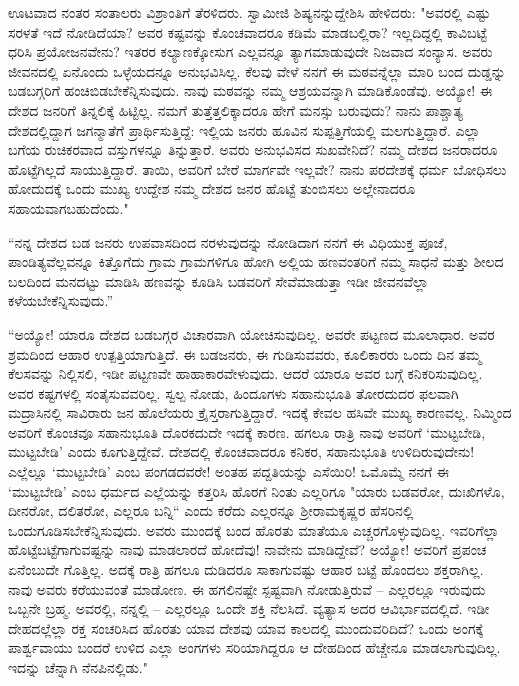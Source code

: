 ಊಟವಾದ ನಂತರ ಸಂತಾಲರು ವಿಶ್ರಾಂತಿಗೆ ತೆರಳಿದರು. ಸ್ವಾಮೀಜಿ ಶಿಷ್ಯನನ್ನುದ್ದೇಶಿಸಿ ಹೇಳಿದರು: "ಅವರಲ್ಲಿ ಎಷ್ಟು ಸರಳತೆ ಇದೆ ನೋಡಿದೆಯಾ? ಅವರ ಕಷ್ಟವನ್ನು ಕೊಂಚವಾದರೂ ಕಡಿಮೆ ಮಾಡಬಲ್ಲಿರಾ? ಇಲ್ಲದಿದ್ದಲ್ಲಿ ಕಾವಿಬಟ್ಟೆ ಧರಿಸಿ ಪ್ರಯೋಜನವೇನು? ಇತರರ ಕಲ್ಯಾಣಕ್ಕೋಸುಗ ಎಲ್ಲವನ್ನೂ ತ್ಯಾಗಮಾಡುವುದೇ ನಿಜವಾದ ಸಂನ್ಯಾಸ. ಅವರು ಜೀವನದಲ್ಲಿ ಏನೊಂದು ಒಳ್ಳೆಯದನ್ನೂ ಅನುಭವಿಸಿಲ್ಲ. ಕೆಲವು ವೇಳೆ ನನಗೆ ಈ ಮಠವನ್ನೆಲ್ಲಾ ಮಾರಿ ಬಂದ ದುಡ್ಡನ್ನು ಬಡಬಗ್ಗರಿಗೆ ಹಂಚಿಬಿಡಬೇಕೆನ್ನಿಸುವುದು. ನಾವು ಮಠವನ್ನು ನಮ್ಮ ಆಶ್ರಯವನ್ನಾಗಿ ಮಾಡಿಕೊಂಡೆವು. ಅಯ್ಯೋ! ಈ ದೇಶದ ಜನರಿಗೆ ತಿನ್ನಲಿಕ್ಕೆ ಹಿಟ್ಟಿಲ್ಲ. ನಮಗೆ ತುತ್ತೆತ್ತಲಿಕ್ಕಾದರೂ ಹೇಗೆ ಮನಸ್ಸು ಬರುವುದು? ನಾನು ಪಾಶ್ಚಾತ್ಯ ದೇಶದಲ್ಲಿದ್ದಾಗ ಜಗನ್ಮಾತೆಗೆ ಪ್ರಾರ್ಥಿಸುತ್ತಿದ್ದೆ: ಇಲ್ಲಿಯ ಜನರು ಹೂವಿನ ಸುಪ್ಪತ್ತಿಗೆಯಲ್ಲಿ ಮಲಗುತ್ತಿದ್ದಾರೆ. ಎಲ್ಲಾ ಬಗೆಯ ರುಚಿಕರವಾದ ವಸ್ತುಗಳನ್ನೂ ತಿನ್ನುತ್ತಾರೆ. ಅವರು ಅನುಭವಿಸದ ಸುಖವೇನಿದೆ? ನಮ್ಮ ದೇಶದ ಜನರಾದರೂ ಹೊಟ್ಟೆಗಿಲ್ಲದೆ ಸಾಯುತ್ತಿದ್ದಾರೆ. ತಾಯಿ, ಅವರಿಗೆ ಬೇರೆ ಮಾರ್ಗವೇ ಇಲ್ಲವೇ? ನಾನು ಪರದೇಶಕ್ಕೆ ಧರ್ಮ ಬೋಧಿಸಲು ಹೋದುದಕ್ಕೆ ಒಂದು ಮುಖ್ಯ ಉದ್ದೇಶ ನಮ್ಮ ದೇಶದ ಜನರ ಹೊಟ್ಟೆ ತುಂಬಿಸಲು ಅಲ್ಲೇನಾದರೂ ಸಹಾಯವಾಗಬಹುದೆಂದು."

“ನನ್ನ ದೇಶದ ಬಡ ಜನರು ಉಪವಾಸದಿಂದ ನರಳುವುದನ್ನು ನೋಡಿದಾಗ ನನಗೆ ಈ ವಿಧಿಯುಕ್ತ ಪೂಜೆ, ಪಾಂಡಿತ್ಯವೆಲ್ಲವನ್ನೂ ಕಿತ್ತೊಗೆದು ಗ್ರಾಮ ಗ್ರಾಮಗಳಿಗೂ ಹೋಗಿ ಅಲ್ಲಿಯ ಹಣವಂತರಿಗೆ ನಮ್ಮ ಸಾಧನೆ ಮತ್ತು ಶೀಲದ ಬಲದಿಂದ ಮನದಟ್ಟು ಮಾಡಿಸಿ ಹಣವನ್ನು ಕೂಡಿಸಿ ಬಡವರಿಗೆ ಸೇವೆಮಾಡುತ್ತಾ ಇಡೀ ಜೀವನವೆಲ್ಲಾ ಕಳೆಯಬೇಕೆನ್ನಿಸುವುದು.”

“ಅಯ್ಯೋ! ಯಾರೂ ದೇಶದ ಬಡಬಗ್ಗರ ವಿಚಾರವಾಗಿ ಯೋಚಿಸುವುದಿಲ್ಲ. ಅವರೇ ಪಟ್ಟಣದ ಮೂಲಾಧಾರ. ಅವರ ಶ್ರಮದಿಂದ ಆಹಾರ ಉತ್ಪತ್ತಿಯಾಗುತ್ತಿದೆ. ಈ ಬಡಜನರು, ಈ ಗುಡಿಸುವವರು, ಕೂಲಿಕಾರರು ಒಂದು ದಿನ ತಮ್ಮ ಕೆಲಸವನ್ನು ನಿಲ್ಲಿಸಲಿ, ಇಡೀ ಪಟ್ಟಣವೇ ಹಾಹಾಕಾರವೇಳುವುದು. ಆದರೆ ಯಾರೂ ಅವರ ಬಗ್ಗೆ ಕನಿಕರಿಸುವುದಿಲ್ಲ. ಅವರ ಕಷ್ಟಗಳಲ್ಲಿ ಸಂತೈಸುವವರಿಲ್ಲ. ಸ್ವಲ್ಪ ನೋಡು, ಹಿಂದೂಗಳು ಸಹಾನುಭೂತಿ ತೋರದುದರ ಫಲವಾಗಿ ಮದ್ರಾಸಿನಲ್ಲಿ ಸಾವಿರಾರು ಜನ ಹೊಲೆಯರು ಕ್ರೈಸ್ತರಾಗುತ್ತಿದ್ದಾರೆ. ಇದಕ್ಕೆ ಕೇವಲ ಹಸಿವೇ ಮುಖ್ಯ ಕಾರಣವಲ್ಲ. ನಿಮ್ಮಿಂದ ಅವರಿಗೆ ಕೊಂಚವೂ ಸಹಾನುಭೂತಿ ದೊರಕದುದೇ ಇದಕ್ಕೆ ಕಾರಣ. ಹಗಲೂ ರಾತ್ರಿ ನಾವು ಅವರಿಗೆ ‘ಮುಟ್ಟಬೇಡಿ, ಮುಟ್ಟಬೇಡಿ’ ಎಂದು ಕೂಗುತ್ತಿದ್ದೇವೆ. ದೇಶದಲ್ಲಿ ಕೊಂಚವಾದರೂ ಕನಿಕರ, ಸಹಾನುಭೂತಿ ಉಳಿದಿರುವುದೇನು! ಎಲ್ಲೆಲ್ಲೂ ‘ಮುಟ್ಟಬೇಡಿ’ ಎಂಬ ಪಂಗಡದವರೇ! ಅಂತಹ ಪದ್ದತಿಯನ್ನು ಎಸೆಯಿರಿ! ಒಮೊಮ್ಮೆ ನನಗೆ ಈ ‘ಮುಟ್ಟಬೇಡಿ’ ಎಂಬ ಧರ್ಮದ ಎಲ್ಲೆಯನ್ನು ಕತ್ತರಿಸಿ ಹೊರಗೆ ನಿಂತು ಎಲ್ಲರಿಗೂ "ಯಾರು ಬಡವರೋ, ದುಃಖಿಗಳೊ, ದೀನರೋ, ದಲಿತರೋ, ಎಲ್ಲರೂ ಬನ್ನಿ“ ಎಂದು ಕರೆದು ಎಲ್ಲರನ್ನೂ ಶ‍್ರೀರಾಮಕೃಷ್ಣರ ಹೆಸರಿನಲ್ಲಿ ಒಂದುಗೂಡಿಸಬೇಕೆನ್ನಿಸುವುದು. ಅವರು ಮುಂದಕ್ಕೆ ಬಂದ ಹೊರತು ಮಾತೆಯೂ ಎಚ್ಚರಗೊಳ್ಳುವುದಿಲ್ಲ. ಇವರಿಗೆಲ್ಲಾ ಹೊಟ್ಟೆಬಟ್ಟೆಗಾಗುವಷ್ಟನ್ನು ನಾವು ಮಾಡಲಾರದೆ ಹೋದೆವು! ನಾವೇನು ಮಾಡಿದ್ದೇವೆ? ಅಯ್ಯೋ! ಅವರಿಗೆ ಪ್ರಪಂಚ ಏನೆಂಬುದೇ ಗೊತ್ತಿಲ್ಲ. ಅದಕ್ಕೆ ರಾತ್ರಿ ಹಗಲೂ ದುಡಿದರೂ ಸಾಕಾಗುವಷ್ಟು ಆಹಾರ ಬಟ್ಟೆ ಹೊಂದಲು ಶಕ್ತರಾಗಿಲ್ಲ. ನಾವು ಅವರು ಕರೆಯುವಂತೆ ಮಾಡೋಣ. ಈ ಹಗಲಿನಷ್ಟೇ ಸ್ಪಷ್ಟವಾಗಿ ನೋಡುತ್ತಿರುವೆ – ಎಲ್ಲರಲ್ಲೂ ಇರುವುದು ಒಬ್ಬನೇ ಬ್ರಹ್ಮ. ಅವರಲ್ಲಿ, ನನ್ನಲ್ಲಿ – ಎಲ್ಲರಲ್ಲೂ ಒಂದೇ ಶಕ್ತಿ ನೆಲಸಿದೆ. ವ್ಯತ್ಯಾಸ ಅದರ ಆವಿರ್ಭಾವದಲ್ಲಿದೆ. ಇಡೀ ದೇಹದಲ್ಲೆಲ್ಲಾ ರಕ್ತ ಸಂಚರಿಸಿದ ಹೊರತು ಯಾವ ದೇಶವು ಯಾವ ಕಾಲದಲ್ಲಿ ಮುಂದುವರಿದಿದೆ? ಒಂದು ಅಂಗಕ್ಕೆ ಪಾರ್ಶ್ವವಾಯು ಬಂದರೆ ಉಳಿದ ಎಲ್ಲಾ ಅಂಗಗಳು ಸರಿಯಾಗಿದ್ದರೂ ಆ ದೇಹದಿಂದ ಹೆಚ್ಚೇನೂ ಮಾಡಲಾಗುವುದಿಲ್ಲ. ಇದನ್ನು ಚೆನ್ನಾಗಿ ನೆನಪಿನಲ್ಲಿಡು."

